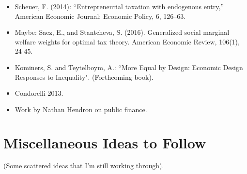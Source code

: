\documentclass[JEL]{AEA}
\begin{document}
\begin{itemize}
    \item Scheuer, F. (2014): “Entrepreneurial taxation with endogenous entry,” American Economic Journal: Economic Policy, 6, 126–63.
            
    \item Maybe: Saez, E., and Stantcheva, S. (2016). Generalized social marginal welfare weights for optimal tax theory. American Economic Review, 106(1), 24-45.
    
    \item Kominers, S. and Teytelboym, A.: ``More Equal by Design: Economic Design Responses to Inequality". (Forthcoming book).
    
    \item Condorelli 2013.
    
    \item Work by Nathan Hendron on public finance.

\end{itemize}

\section{Miscellaneous Ideas to Follow}

(Some scattered ideas that I'm still working through).
\end{document}
